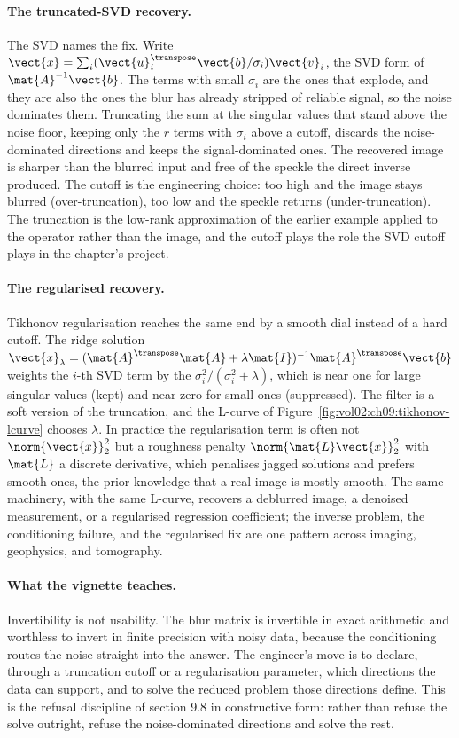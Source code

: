 \paragraph{The truncated-SVD recovery.}
The SVD names the fix. Write $\vect{x} = \sum_{i} (\vect{u}_{i}^{
\transpose}\vect{b}/\sigma_{i})\vect{v}_{i}$, the SVD form of
$\mat{A}^{-1}\vect{b}$. The terms with small $\sigma_{i}$ are the ones
that explode, and they are also the ones the blur has already stripped
of reliable signal, so the noise dominates them. Truncating the sum at
the singular values that stand above the noise floor, keeping only the
$r$ terms with $\sigma_{i}$ above a cutoff, discards the noise-dominated
directions and keeps the signal-dominated ones. The recovered image is
sharper than the blurred input and free of the speckle the direct
inverse produced. The cutoff is the engineering choice: too high and the
image stays blurred (over-truncation), too low and the speckle returns
(under-truncation). The truncation is the low-rank approximation of the
earlier example applied to the operator rather than the image, and the
cutoff plays the role the SVD cutoff plays in the chapter's project.

\paragraph{The regularised recovery.}
Tikhonov regularisation reaches the same end by a smooth dial instead of
a hard cutoff. The ridge solution $\vect{x}_{\lambda} = (\mat{A}^{
\transpose}\mat{A} + \lambda\mat{I})^{-1}\mat{A}^{\transpose}\vect{b}$
weights the $i$-th SVD term by the 
$\sigma_{i}^{2}/(\sigma_{i}^{2} + \lambda)$, which is near one for large
singular values (kept) and near zero for small ones (suppressed). The
filter is a soft version of the truncation, and the L-curve of
Figure~\ref{fig:vol02:ch09:tikhonov-lcurve} chooses $\lambda$. In
practice the regularisation term is often not $\norm{\vect{x}}_{2}^{2}$
but a roughness penalty $\norm{\mat{L}\vect{x}}_{2}^{2}$ with $\mat{L}$
a discrete derivative, which penalises jagged solutions and prefers
smooth ones, the prior knowledge that a real image is mostly smooth. The
same machinery, with the same L-curve, recovers a deblurred image, a
denoised measurement, or a regularised regression coefficient; the
inverse problem, the conditioning failure, and the regularised fix are
one pattern across imaging, geophysics, and tomography.

\paragraph{What the vignette teaches.}
Invertibility is not usability. The blur matrix is invertible in exact
arithmetic and worthless to invert in finite precision with noisy data,
because the conditioning routes the noise straight into the answer. The
engineer's move is to declare, through a truncation cutoff or a
regularisation parameter, which directions the data can support, and to
solve the reduced problem those directions define. This is the refusal
discipline of section 9.8 in constructive form: rather than refuse the
solve outright, refuse the noise-dominated directions and solve the
rest.

